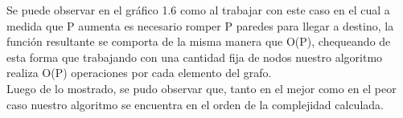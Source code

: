 Se puede observar en el gr\'afico 1.6 como al trabajar con este caso en el cual a medida que P aumenta es necesario romper P paredes para llegar a destino, la funci\'on resultante se comporta de la misma manera que O(P), chequeando de esta forma que trabajando con una cantidad fija de nodos nuestro algoritmo realiza O(P) operaciones por cada elemento del grafo.\\

Luego de lo mostrado, se pudo observar que, tanto en el mejor como en el peor caso nuestro algoritmo se encuentra en el orden de la complejidad calculada.